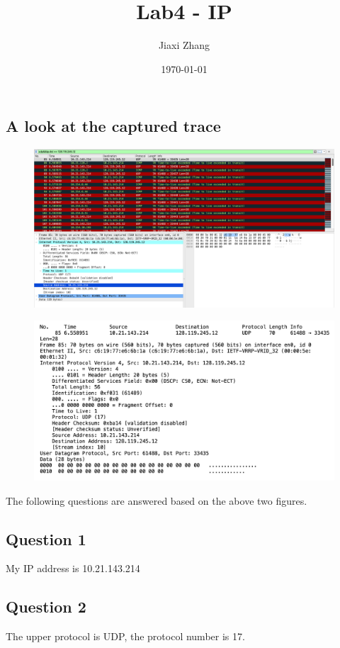 \documentclass{article}
\title{Lab4 - IP}
\author{Jiaxi Zhang}
\date{\today}
\begin{document}
\maketitle
\begin{CJK*}{UTF8}{gbsn}

\section{A look at the captured trace}
\begin{figure}[H]
    \centering
    \includegraphics[width=1.0\textwidth]{0.png}
\end{figure}
\begin{figure}[H]
    \centering
    \includegraphics[width=1.0\textwidth]{0-1.png}
\end{figure}
The following questions are answered based on the above two figures.
\subsection{Question 1}
My IP address is 10.21.143.214
\subsection{Question 2}
The upper protocol is UDP, the protocol number is 17.

\end{CJK*}
\end{document}
